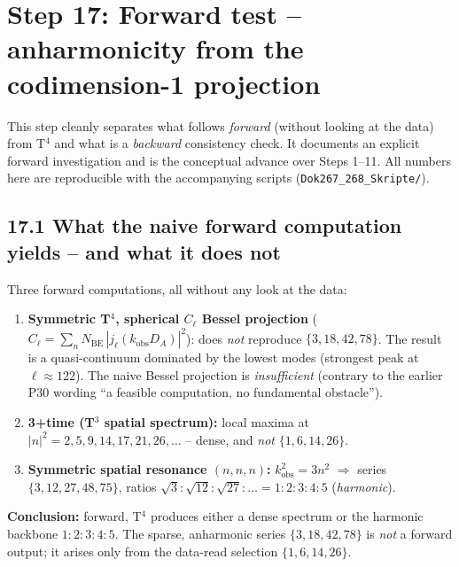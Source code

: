 \section{Step 17: Forward test -- anharmonicity from the codimension-1 projection}

This step cleanly separates what follows \emph{forward} (without looking at
the data) from T$^4$ and what is a \emph{backward} consistency check. It
documents an explicit forward investigation and is the conceptual advance over
Steps 1--11. All numbers here are reproducible with the accompanying scripts
(\texttt{Dok267\_268\_Skripte/}).

\subsection*{17.1 What the naive forward computation yields -- and what it does not}

Three forward computations, all without any look at the data:

\begin{enumerate}
  \item \textbf{Symmetric T$^4$, spherical $C_\ell$ Bessel projection}
        ($C_\ell = \sum_n N_\mathrm{BE}\,|j_\ell(k_\mathrm{obs}D_A)|^2$):
        does \emph{not} reproduce $\{3,18,42,78\}$. The result is a
        quasi-continuum dominated by the lowest modes (strongest peak at
        $\ell\approx122$). The naive Bessel projection is \emph{insufficient}
        (contrary to the earlier P30 wording ``a feasible computation, no
        fundamental obstacle'').
  \item \textbf{3+time (T$^3$ spatial spectrum):} local maxima at
        $|n|^2=2,5,9,14,17,21,26,\ldots$ -- dense, and \emph{not}
        $\{1,6,14,26\}$.
  \item \textbf{Symmetric spatial resonance $(n,n,n)$:} $k^2_\mathrm{obs}=3n^2$
        $\Rightarrow$ series $\{3,12,27,48,75\}$, ratios
        $\sqrt{3}:\sqrt{12}:\sqrt{27}:\ldots = 1:2:3:4:5$ (\emph{harmonic}).
\end{enumerate}

\textbf{Conclusion:} forward, T$^4$ produces either a dense spectrum or the
harmonic backbone $1:2:3:4:5$. The sparse, anharmonic series $\{3,18,42,78\}$
is \emph{not} a forward output; it arises only from the data-read selection
$\{1,6,14,26\}$.


